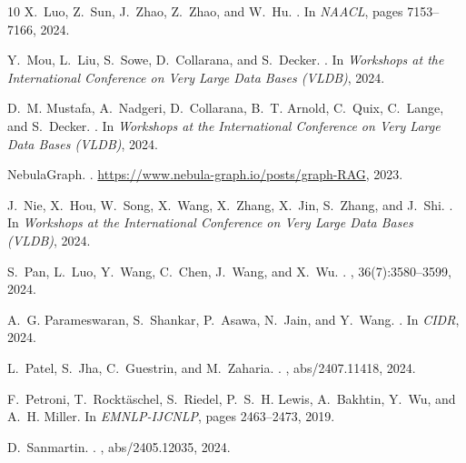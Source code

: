 \documentclass{sig-alternate-10pt}
\begin{document}
\begin{small}
\begin{thebibliography}{10}
X.~Luo, Z.~Sun, J.~Zhao, Z.~Zhao, and W.~Hu.
.
\newblock In {\em NAACL}, pages 7153--7166, 2024.

Y.~Mou, L.~Liu, S.~Sowe, D.~Collarana, and S.~Decker.
.
\newblock In {\em Workshops at the International Conference on Very Large Data Bases (VLDB)}, 2024.

D.~M. Mustafa, A.~Nadgeri, D.~Collarana, B.~T. Arnold, C.~Quix, C.~Lange, and S.~Decker.
.
\newblock In {\em Workshops at the International Conference on Very Large Data Bases (VLDB)}, 2024.

NebulaGraph.
.
\newblock \url{https://www.nebula-graph.io/posts/graph-RAG}, 2023.

J.~Nie, X.~Hou, W.~Song, X.~Wang, X.~Zhang, X.~Jin, S.~Zhang, and J.~Shi.
.
\newblock In {\em Workshops at the International Conference on Very Large Data Bases (VLDB)}, 2024.

S.~Pan, L.~Luo, Y.~Wang, C.~Chen, J.~Wang, and X.~Wu.
.
, 36(7):3580--3599, 2024.

A.~G. Parameswaran, S.~Shankar, P.~Asawa, N.~Jain, and Y.~Wang.
.
\newblock In {\em CIDR}, 2024.

L.~Patel, S.~Jha, C.~Guestrin, and M.~Zaharia.
.
, abs/2407.11418, 2024.

F.~Petroni, T.~Rockt{\"{a}}schel, S.~Riedel, P.~S.~H. Lewis, A.~Bakhtin, Y.~Wu, and A.~H. Miller.
\newblock In {\em EMNLP-IJCNLP}, pages 2463--2473, 2019.

D.~Sanmartin.
.
, abs/2405.12035, 2024.


\end{thebibliography}
\end{small}
\end{document}
